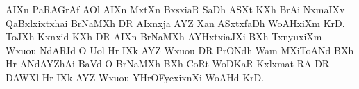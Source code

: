 
AIXn PaRAGrAf AOl   AIXn MxtXn BxsxiaR SaDh ASXt   KXh BrAi NxmaIXv QaBxlxixtxhai
BrNaMXh \ylTXkFaRSXi{} DR AIxnxja AYZ Xan ASxtxfaDh WoAHxiXm KrD.
ToJXh Kxnxid      KXh DR AIXn BrNaMXh AYHxtxiaJXi BXh TxnyuxiXm Wxuou NdARId O Uol Hr
IXk AYZ Wxuou DR PrONdh Wam MXiToANd BXh Hr ANdAYZhAi   BaVd O BrNaMXh
\ylTXkFaRSXi{} BXh CoRt WoDKaR Kxlxmat RA DR DAWXl Hr IXk AYZ Wxuou
YHrOFycxixnXi WoAHd KrD. 

